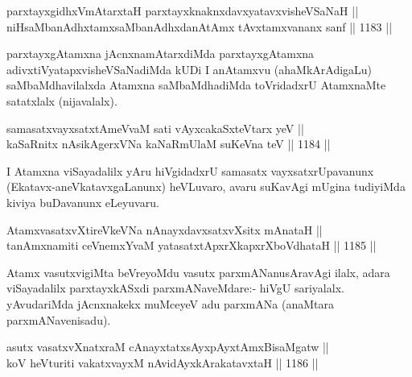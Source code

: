 \begin{shl}
parxtayxgidhxVmAtarxtaH parxtayxknaknxdavxyatavxvisheVSaNaH || \\
niHsaMbanAdhxtamxsaMbanAdhxdanAtAmx tAvxtamxvananx sanf ||  1183 ||  
\end{shl}

\begin{artha}
parxtayxgAtamxna jAcnxnamAtarxdiMda parxtayxgAtamxna adivxtiVyatapxvisheVSaNadiMda kUDi I anAtamxvu (ahaMkArAdigaLu) saMbaMdhavilalxda Atamxna saMbaMdhadiMda toVridadxrU AtamxnaMte satatxlalx (nijavalalx).
\end{artha}


\begin{shl}
samasatxvayxsatxtAmeVvaM sati vAyxcakaSxteV\s tarx yeV || \\
kaSaRnitx nAsikAgerxVNa kaNaRmUlaM suKeVna teV ||  1184 ||  
\end{shl}

\begin{artha}
I Atamxna viSayadalilx yAru hiVgidadxrU samasatx vayxsatxrUpavanunx (Ekatavx-aneVkatavxgaLanunx) heVLuvaro, avaru suKavAgi mUgina tudiyiMda kiviya buDavanunx eLeyuvaru.
\end{artha}

\begin{shl}
AtamxvasatxvXtireVkeVNa nAnayxdavxsatxvXsitx mAnataH || \\
tanAmxnamiti ceVnemxYvaM yatasatxtApxrXkapxrXboVdhataH ||  1185 ||  
\end{shl}

\begin{artha}
Atamx vasutxvigiMta beVreyoMdu vasutx parxmANanusAravAgi ilalx, adara viSayadalilx parxtayxkASxdi parxmANaveMdare:- hiVgU sariyalalx. yAvudariMda jAcnxnakekx muMceyeV adu parxmANa (anaMtara parxmANavenisadu).
\end{artha}

\begin{shl}
\footnotemark[1]asutx vasatxvXnatxraM cAnayxtatxsAyxpAyxtAmxBisaMgatw || \\
koV heVturiti vakatxvayxM nAvidAyx\s kArakatavxtaH ||  1186 ||  
\end{shl}

